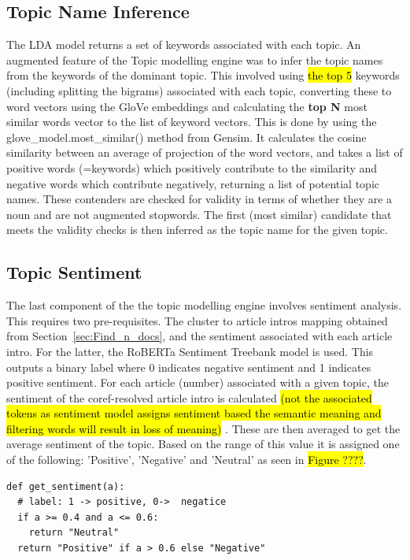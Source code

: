 \subsection{Topic Name Inference}
The LDA model returns a set of keywords associated with each topic. An augmented feature of the Topic modelling engine was to infer the topic names from the keywords of the dominant topic. This involved using \hl{the top 5} keywords (including splitting the bigrams) associated with each topic, converting these to word vectors using the GloVe embeddings and calculating the \textbf{top N }most similar words vector to the list of keyword vectors. This is done by using the glove\_model.most\_similar() method from Gensim. It calculates the cosine similarity between an average of projection of the word vectors, and takes a list of positive words (=keywords) which positively contribute to the similarity and negative words which contribute negatively, returning a list of potential topic names. These contenders are checked for validity in terms of whether they are a noun and are not augmented stopwords. The first (most similar) candidate that meets the validity checks is then inferred as the topic name for the given topic. 


\subsection{Topic Sentiment}

The last component of the the topic modelling engine involves sentiment analysis. This requires two pre-requisites. The cluster to article intros mapping obtained from Section~\ref{sec:Find_n_docs}, and the sentiment associated with each article intro. For the latter, the RoBERTa Sentiment Treebank model is used. This outputs a binary label where 0 indicates negative sentiment and 1 indicates positive sentiment. For each article (number) associated with a given topic, the sentiment of the coref-resolved article intro is calculated \hl{(not the associated tokens as sentiment model assigns sentiment based the semantic meaning and filtering words will result in loss of meaning) }. These are then averaged to get the average sentiment of the topic. Based on the range of this value it is assigned one of the following: 'Positive', 'Negative' and 'Neutral' as seen in \hl{Figure ????}.

\begin{verbatim}
def get_sentiment(a):
  # label: 1 -> positive, 0->  negatice
  if a >= 0.4 and a <= 0.6:
    return "Neutral"
  return "Positive" if a > 0.6 else "Negative"
\end{verbatim}


